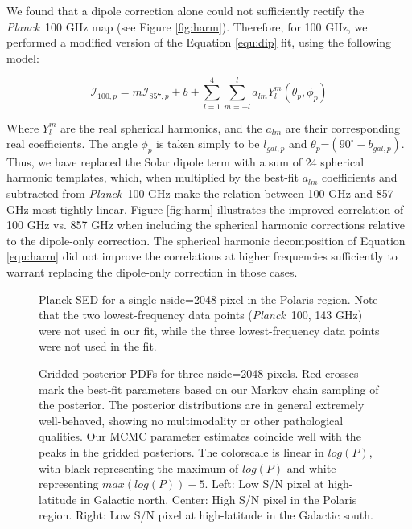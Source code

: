 \documentclass{emulateapj}
\newcommand{\PLANCK}{{\it Planck}}
\begin{document}
We found that a dipole correction alone could not sufficiently rectify the 
\PLANCK~100 GHz map (see Figure \ref{fig:harm}). Therefore, for 100 GHz, we 
performed a modified version of the Equation \ref{equ:dip} fit, using the 
following model:

\begin{equation} \label{equ:harm}
\mathcal{I}_{100, p} = m\mathcal{I}_{857, p} + b + \sum_{l=1}^{4} \sum_{m=-l}^{l} a_{lm}Y_{l}^{m}(\theta_p, \phi_p)
\end{equation}

Where $Y_{l}^{m}$ are the real spherical harmonics, and the $a_{lm}$ are their 
corresponding real coefficients. The angle $\phi_p$ is taken simply to be 
$l_{gal, p}$ and $\theta_p$=$(90^{\circ}-b_{gal, p})$. Thus, we have replaced 
the Solar dipole term with a sum of 24 spherical harmonic templates, which, 
when multiplied by the best-fit $a_{lm}$ coefficients and subtracted from 
\PLANCK~100 GHz make the relation between 100 GHz and 857 GHz most tightly 
linear. Figure \ref{fig:harm} illustrates the improved correlation of 100 GHz 
vs. 857 GHz when including the spherical harmonic corrections relative to the 
dipole-only correction. The spherical harmonic decomposition of Equation 
\ref{equ:harm} did not improve the correlations at higher frequencies 
sufficiently to warrant replacing the dipole-only correction in those cases.


\begin{figure}
\begin{center}
\caption{\label{fig:sed} Planck SED for a single nside=2048 pixel in the 
Polaris region. Note that the two lowest-frequency data points (\PLANCK~100, 
143 GHz) were not used in our fit, while the three lowest-frequency data
points were not used in the \cite{planckdust} fit.}
\end{center}
\end{figure}


\begin{figure*}
\begin{center}
\caption{Gridded posterior PDFs for three nside=2048 pixels. Red crosses mark 
the best-fit parameters based on our Markov chain sampling of the posterior. 
The posterior distributions are in general extremely well-behaved, showing
no multimodality or other pathological qualities. Our MCMC parameter 
estimates coincide well with the peaks in the gridded posteriors. The 
colorscale is linear in $log(P)$, with black representing the maximum of 
$log(P)$ and white representing $max(log(P))-5$. Left: Low S/N pixel at 
high-latitude in Galactic north. Center: High S/N pixel in the Polaris region. 
Right: Low S/N pixel at high-latitude in the Galactic south.}
\end{center}
\end{figure*}
\end{document}
